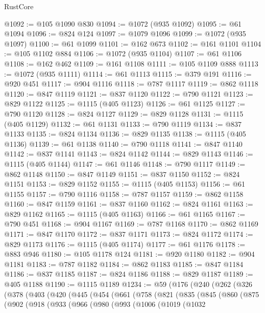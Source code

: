 \begin{lexlean}{RustCore}
\begin{coremodule}
@1092 := @105 @1090 @830
@1094 := @1072 (@935 @1092)
@1095 := @61 @1094
@1096 := @824 @124
@1097 := @1079 @1096
@1099 := @1072 (@935 @1097)
@1100 := @61 @1099
@1101 := @162 @673
@1102 := @161 @1101
@1104 := @105 @1102 @884
@1106 := @1072 (@935 @1104)
@1107 := @61 @1106
@1108 := @162 @462
@1109 := @161 @1108
@1111 := @105 @1109 @888
@1113 := @1072 (@935 @1111)
@1114 := @61 @1113
@1115 := @379 @191
@1116 := @920 @451
@1117 := @904 @1116
@1118 := @787 @1117
@1119 := @862 @1118
@1120 := @847 @1119
@1121 := @837 @1120
@1122 := @790 @1121
@1123 := @829 @1122
@1125 := @1115 (@405 @1123)
@1126 := @61 @1125
@1127 := @790 @1120
@1128 := @824 @1127
@1129 := @829 @1128
@1131 := @1115 (@405 @1129)
@1132 := @61 @1131
@1133 := @790 @1119
@1134 := @837 @1133
@1135 := @824 @1134
@1136 := @829 @1135
@1138 := @1115 (@405 @1136)
@1139 := @61 @1138
@1140 := @790 @1118
@1141 := @847 @1140
@1142 := @837 @1141
@1143 := @824 @1142
@1144 := @829 @1143
@1146 := @1115 (@405 @1144)
@1147 := @61 @1146
@1148 := @790 @1117
@1149 := @862 @1148
@1150 := @847 @1149
@1151 := @837 @1150
@1152 := @824 @1151
@1153 := @829 @1152
@1155 := @1115 (@405 @1153)
@1156 := @61 @1155
@1157 := @790 @1116
@1158 := @787 @1157
@1159 := @862 @1158
@1160 := @847 @1159
@1161 := @837 @1160
@1162 := @824 @1161
@1163 := @829 @1162
@1165 := @1115 (@405 @1163)
@1166 := @61 @1165
@1167 := @790 @451
@1168 := @904 @1167
@1169 := @787 @1168
@1170 := @862 @1169
@1171 := @847 @1170
@1172 := @837 @1171
@1173 := @824 @1172
@1174 := @829 @1173
@1176 := @1115 (@405 @1174)
@1177 := @61 @1176
@1178 := @883 @946
@1180 := @105 @1178 @124
@1181 := @920 @1180
@1182 := @904 @1181
@1183 := @787 @1182
@1184 := @862 @1183
@1185 := @847 @1184
@1186 := @837 @1185
@1187 := @824 @1186
@1188 := @829 @1187
@1189 := @405 @1188
@1190 := @1115 @1189
@1234 := @59
    (@176
      (@240
        (@262
          (@326
            (@378
              (@403
                (@420
                  (@445
                    (@454
                      (@661
                        (@758
                          (@821
                            (@835
                              (@845
                                (@860
                                  (@875
                                    (@902
                                      (@918
                                        (@933
                                          (@966
                                            (@980
                                              (@993
                                                (@1006
                                                  (@1019
                                                    (@1032

\end{coremodule}
\end{lexlean}
